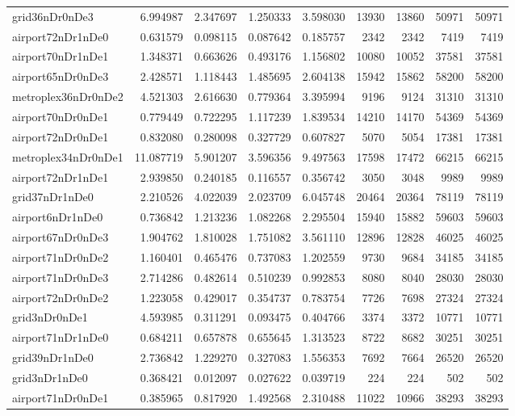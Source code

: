 \begin{longtable}{|l|r|r|r|r|r|r|r|r|}
grid36nDr0nDe3 & 6.994987 & 2.347697 & 1.250333 & 3.598030 & 13930 & 13860 & 50971 & 50971 \\
airport72nDr1nDe0 & 0.631579 & 0.098115 & 0.087642 & 0.185757 & 2342 & 2342 & 7419 & 7419 \\
airport70nDr1nDe1 & 1.348371 & 0.663626 & 0.493176 & 1.156802 & 10080 & 10052 & 37581 & 37581 \\
airport65nDr0nDe3 & 2.428571 & 1.118443 & 1.485695 & 2.604138 & 15942 & 15862 & 58200 & 58200 \\
metroplex36nDr0nDe2 & 4.521303 & 2.616630 & 0.779364 & 3.395994 & 9196 & 9124 & 31310 & 31310 \\
airport70nDr0nDe1 & 0.779449 & 0.722295 & 1.117239 & 1.839534 & 14210 & 14170 & 54369 & 54369 \\
airport72nDr0nDe1 & 0.832080 & 0.280098 & 0.327729 & 0.607827 & 5070 & 5054 & 17381 & 17381 \\
metroplex34nDr0nDe1 & 11.087719 & 5.901207 & 3.596356 & 9.497563 & 17598 & 17472 & 66215 & 66215 \\
airport72nDr1nDe1 & 2.939850 & 0.240185 & 0.116557 & 0.356742 & 3050 & 3048 & 9989 & 9989 \\
grid37nDr1nDe0 & 2.210526 & 4.022039 & 2.023709 & 6.045748 & 20464 & 20364 & 78119 & 78119 \\
airport6nDr1nDe0 & 0.736842 & 1.213236 & 1.082268 & 2.295504 & 15940 & 15882 & 59603 & 59603 \\
airport67nDr0nDe3 & 1.904762 & 1.810028 & 1.751082 & 3.561110 & 12896 & 12828 & 46025 & 46025 \\
airport71nDr0nDe2 & 1.160401 & 0.465476 & 0.737083 & 1.202559 & 9730 & 9684 & 34185 & 34185 \\
airport71nDr0nDe3 & 2.714286 & 0.482614 & 0.510239 & 0.992853 & 8080 & 8040 & 28030 & 28030 \\
airport72nDr0nDe2 & 1.223058 & 0.429017 & 0.354737 & 0.783754 & 7726 & 7698 & 27324 & 27324 \\
grid3nDr0nDe1 & 4.593985 & 0.311291 & 0.093475 & 0.404766 & 3374 & 3372 & 10771 & 10771 \\
airport71nDr1nDe0 & 0.684211 & 0.657878 & 0.655645 & 1.313523 & 8722 & 8682 & 30251 & 30251 \\
grid39nDr1nDe0 & 2.736842 & 1.229270 & 0.327083 & 1.556353 & 7692 & 7664 & 26520 & 26520 \\
grid3nDr1nDe0 & 0.368421 & 0.012097 & 0.027622 & 0.039719 & 224 & 224 & 502 & 502 \\
airport71nDr0nDe1 & 0.385965 & 0.817920 & 1.492568 & 2.310488 & 11022 & 10966 & 38293 & 38293 \\

\end{longtable}
